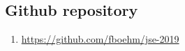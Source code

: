 \documentclass[
]{article}
\providecommand{\tightlist}{%
  \setlength{\itemsep}{0pt}\setlength{\parskip}{0pt}}
\begin{document}
\hypertarget{github-repository}{%
\subsection{Github repository}\label{github-repository}}

\begin{enumerate}
\def\labelenumi{\arabic{enumi}.}
\tightlist
\item
  \url{https://github.com/fboehm/jse-2019}
\end{enumerate}
\end{document}
